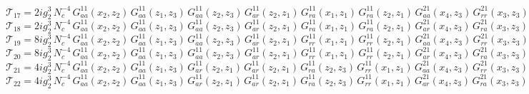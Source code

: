 \documentclass{article}
\begin{document}
\begin{equation*}
\mathcal{T}_{17} = 2 i g_{2}^{3}\,N_c^{-4}\,G^{11}_{aa}\left(x_2,z_{2}\right) \, G^{11}_{aa}\left(z_{1},z_{3}\right) \, G^{11}_{aa}\left(z_{2},z_{3}\right) \, G^{11}_{ar}\left(z_{2},z_{1}\right) \, G^{11}_{ra}\left(x_1,z_{1}\right) \, G^{11}_{ra}\left(z_{2},z_{1}\right) \, G^{21}_{aa}\left(x_4,z_{3}\right) \, G^{21}_{rr}\left(x_3,z_{3}\right)
\end{equation*}
\begin{equation*}
\mathcal{T}_{18} = 2 i g_{2}^{3}\,N_c^{-4}\,G^{11}_{aa}\left(x_2,z_{2}\right) \, G^{11}_{aa}\left(z_{1},z_{3}\right) \, G^{11}_{aa}\left(z_{2},z_{3}\right) \, G^{11}_{ar}\left(z_{2},z_{1}\right) \, G^{11}_{ra}\left(x_1,z_{1}\right) \, G^{11}_{ra}\left(z_{2},z_{1}\right) \, G^{21}_{ar}\left(x_4,z_{3}\right) \, G^{21}_{ra}\left(x_3,z_{3}\right)
\end{equation*}
\begin{equation*}
\mathcal{T}_{19} = 8 i g_{2}^{3}\,N_c^{-4}\,G^{11}_{aa}\left(x_2,z_{2}\right) \, G^{11}_{aa}\left(z_{1},z_{3}\right) \, G^{11}_{aa}\left(z_{2},z_{3}\right) \, G^{11}_{ar}\left(z_{2},z_{1}\right) \, G^{11}_{rr}\left(x_1,z_{1}\right) \, G^{11}_{rr}\left(z_{2},z_{1}\right) \, G^{21}_{aa}\left(x_4,z_{3}\right) \, G^{21}_{rr}\left(x_3,z_{3}\right)
\end{equation*}
\begin{equation*}
\mathcal{T}_{20} = 8 i g_{2}^{3}\,N_c^{-4}\,G^{11}_{aa}\left(x_2,z_{2}\right) \, G^{11}_{aa}\left(z_{1},z_{3}\right) \, G^{11}_{aa}\left(z_{2},z_{3}\right) \, G^{11}_{ar}\left(z_{2},z_{1}\right) \, G^{11}_{rr}\left(x_1,z_{1}\right) \, G^{11}_{rr}\left(z_{2},z_{1}\right) \, G^{21}_{ar}\left(x_4,z_{3}\right) \, G^{21}_{ra}\left(x_3,z_{3}\right)
\end{equation*}
\begin{equation*}
\mathcal{T}_{21} = 4 i g_{2}^{3}\,N_c^{-4}\,G^{11}_{aa}\left(x_2,z_{2}\right) \, G^{11}_{aa}\left(z_{1},z_{3}\right) \, G^{11}_{ar}\left(z_{2},z_{1}\right) \, G^{11}_{ar}\left(z_{2},z_{1}\right) \, G^{11}_{ra}\left(z_{2},z_{3}\right) \, G^{11}_{rr}\left(x_1,z_{1}\right) \, G^{21}_{aa}\left(x_4,z_{3}\right) \, G^{21}_{rr}\left(x_3,z_{3}\right)
\end{equation*}
\begin{equation*}
\mathcal{T}_{22} = 4 i g_{2}^{3}\,N_c^{-4}\,G^{11}_{aa}\left(x_2,z_{2}\right) \, G^{11}_{aa}\left(z_{1},z_{3}\right) \, G^{11}_{ar}\left(z_{2},z_{1}\right) \, G^{11}_{ar}\left(z_{2},z_{1}\right) \, G^{11}_{ra}\left(z_{2},z_{3}\right) \, G^{11}_{rr}\left(x_1,z_{1}\right) \, G^{21}_{ar}\left(x_4,z_{3}\right) \, G^{21}_{ra}\left(x_3,z_{3}\right)
\end{equation*}
\end{document}

